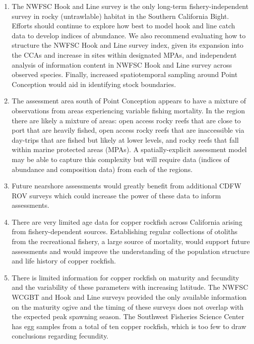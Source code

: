 \documentclass[11pt,
  letterpaper,
]{article}
\begin{document}
\begin{enumerate}

    \item  The NWFSC Hook and Line survey is the only long-term fishery-independent survey in rocky (untrawlable) habitat in the Southern California Bight. Efforts should continue to explore how best to model hook and line catch data to develop indices of abundance. We also recommend evaluating how to structure the NWFSC Hook and Line survey index, given its expansion into the CCAs and increase in sites within designated MPAs, and independent analysis of information content in NWFSC Hook and Line survey across observed species. Finally, increased spatiotemporal sampling around Point Conception would aid in identifying stock boundaries.

    \item The assessment area south of Point Conception appears to have a mixture of observations from areas experiencing variable fishing mortality. In the region there are likely a mixture of areas: open access rocky reefs that are close to port that are heavily fished, open access rocky reefs that are inaccessible via day-trips that are fished but likely at lower levels, and rocky reefs that fall within marine protected areas (MPAs). A spatially-explicit assessment model may be able to capture this complexity but will require data (indices of abundance and composition data) from each of the regions. 
    
    \item Future nearshore assessments would greatly benefit from additional CDFW ROV surveys which could increase the power of these data to inform assessments.

    \item There are very limited age data for copper rockfish across California arising from fishery-dependent sources. Establishing regular collections of otoliths from the recreational fishery, a large source of mortality, would support future assessments and would improve the understanding of the population structure and life history of copper rockfish. 

    \item There is limited information for copper rockfish on maturity and fecundity and the variability of these parameters with increasing latitude.  The NWFSC WCGBT and Hook and Line surveys provided the only available information on the maturity ogive and the timing of these surveys does not overlap with the expected peak spawning season. The Southwest Fisheries Science Center has egg samples from a total of ten copper rockfish, which is too few to draw conclusions regarding fecundity.


\end{enumerate}
\end{document}

